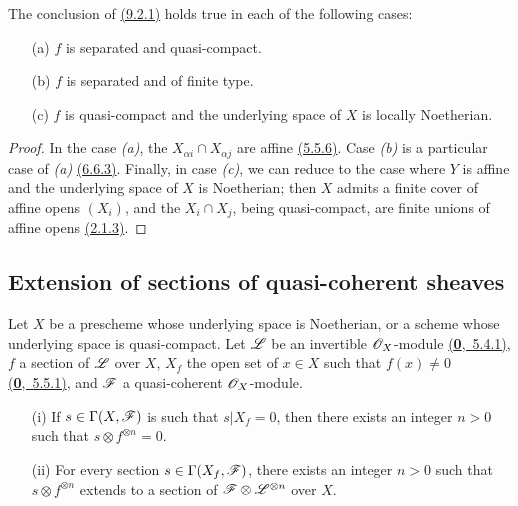 \begin{cor}[9.2.2]
\label{cor-1.9.2.2}
The conclusion of \hyperref[prop-1.9.2.1]{(9.2.1)} holds true in each of the following cases:
\begin{itemize}
  \item[{\rm(a)}] $f$ is separated and quasi-compact.
  \item[{\rm(b)}] $f$ is separated and of finite type.
  \item[{\rm(c)}] $f$ is quasi-compact and the underlying space of $X$ is locally Noetherian.
\end{itemize}
\end{cor}

\begin{proof}
\label{proof-cor-1.9.2.2}
In the case {\it (a)}, the $X_{\alpha i}\cap X_{\alpha j}$ are affine \hyperref[env-1.5.5.6]{(5.5.6)}.
Case {\it (b)} is a particular case of {\it (a)} \hyperref[env-1.6.6.3]{(6.6.3)}. Finally, in case
{\it (c)}, we can reduce to the case where $Y$ is affine and the underlying
space of $X$ is Noetherian; then $X$ admits a finite cover of affine opens
$(X_i)$, and the $X_i\cap X_j$, being quasi-compact, are finite unions of affine
opens \hyperref[prop-1.2.1.3]{(2.1.3)}.
\end{proof}

\subsection{Extension of sections of quasi-coherent sheaves}
\label{subsection-extension-of-sections-of-qcoh}

\begin{thm}[9.3.1]
\label{thm-1.9.3.1}
Let $X$ be a prescheme whose underlying space is Noetherian, or a scheme whose underlying
space is quasi-compact. Let $\mathscr{L}$ be an invertible $\mathscr{O}_X$-module \hyperref[env-0.5.4.1]{(\textbf{0},~5.4.1)}, $f$ a
section of $\mathscr{L}$ over $X$, $X_f$ the open set of $x\in X$ such that $f(x)\neq0$
\hyperref[env-0.5.5.1]{(\textbf{0},~5.5.1)}, and $\mathscr{F}$ a quasi-coherent $\mathscr{O}_X$-module.
\begin{itemize}
  \item[{\rm(i)}] If $s\in\Gamma(X,\mathscr{F})$ is such that $s|X_f=0$, then there exists an integer $n>0$
        such that $s\otimes f^{\otimes n}=0$.
  \item[{\rm(ii)}] For every section $s\in\Gamma(X_f,\mathscr{F})$, there exists an integer $n>0$ such that
        $s\otimes f^{\otimes n}$ extends to a section of $\mathscr{F}\otimes\mathscr{L}^{\otimes n}$
        over $X$.
\end{itemize}
\end{thm}

